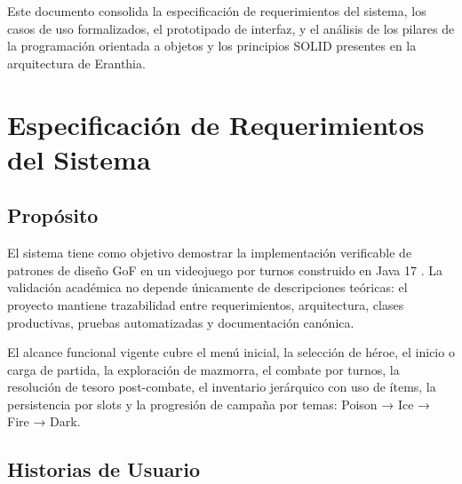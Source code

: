 \documentclass[stu,12pt,floatsintext]{apa7}
\begin{document}
Este documento consolida la especificación de requerimientos del sistema, los casos de uso formalizados, el prototipado de interfaz, y el análisis de los pilares de la programación orientada a objetos y los principios SOLID presentes en la arquitectura de Eranthia.


\section{Especificación de Requerimientos del Sistema}

\subsection{Propósito}

El sistema tiene como objetivo demostrar la implementación verificable de patrones de diseño GoF en un videojuego por turnos construido en Java 17 \parencite{oracle2021}. La validación académica no depende únicamente de descripciones teóricas: el proyecto mantiene trazabilidad entre requerimientos, arquitectura, clases productivas, pruebas automatizadas y documentación canónica.

El alcance funcional vigente cubre el menú inicial, la selección de héroe, el inicio o carga de partida, la exploración de mazmorra, el combate por turnos, la resolución de tesoro post-combate, el inventario jerárquico con uso de ítems, la persistencia por slots y la progresión de campaña por temas: Poison → Ice → Fire → Dark.


\subsection{Historias de Usuario}
\end{document}
